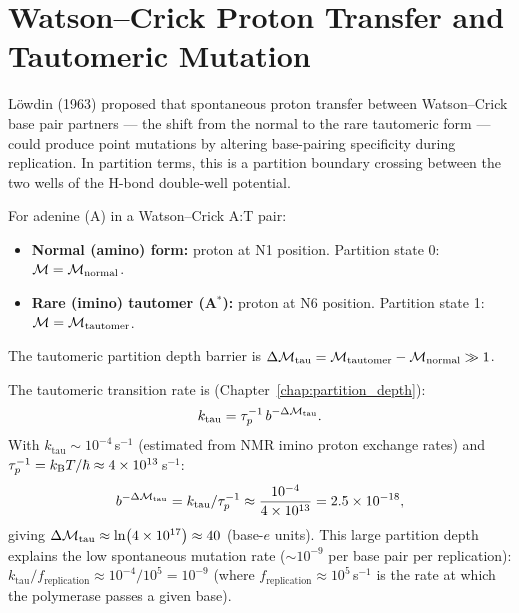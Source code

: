 \section{Watson--Crick Proton Transfer and Tautomeric Mutation}
\label{sec:proton_transfer}

Löwdin (1963) proposed that spontaneous proton transfer between Watson--Crick
base pair partners --- the shift from the normal to the rare tautomeric form ---
could produce point mutations by altering base-pairing specificity during
replication. In partition terms, this is a partition boundary crossing
between the two wells of the H-bond double-well potential.

\begin{definition}
\label{def:tautomeric_states}
For adenine (A) in a Watson--Crick A:T pair:
\begin{itemize}
  \item \textbf{Normal (amino) form:} proton at N1 position.
        Partition state 0: $\mathcal{M} = \mathcal{M}_{\mathrm{normal}}$.
  \item \textbf{Rare (imino) tautomer (A$^*$):} proton at N6 position.
        Partition state 1: $\mathcal{M} = \mathcal{M}_{\mathrm{tautomer}}$.
\end{itemize}
The tautomeric partition depth barrier is
$\Delta\mathcal{M}_{\mathrm{tau}} = \mathcal{M}_{\mathrm{tautomer}} - \mathcal{M}_{\mathrm{normal}} \gg 1$.
\end{definition}

The tautomeric transition rate is (Chapter~\ref{chap:partition_depth}):
\begin{equation}
  k_{\mathrm{tau}} = \tau_p^{-1}\,b^{-\Delta\mathcal{M}_{\mathrm{tau}}}.
  \label{eq:tautomeric_rate}
\end{equation}
With $k_{\mathrm{tau}} \sim 10^{-4}$\,s$^{-1}$ (estimated from NMR imino proton
exchange rates) and $\tau_p^{-1} = k_{\mathrm{B}} T / \hbar \approx 4 \times 10^{13}$\,s$^{-1}$:
\begin{equation}
  b^{-\Delta\mathcal{M}_{\mathrm{tau}}} = k_{\mathrm{tau}} / \tau_p^{-1}
    \approx \frac{10^{-4}}{4 \times 10^{13}} = 2.5 \times 10^{-18},
  \label{eq:tautomeric_depth_ratio}
\end{equation}
giving $\Delta\mathcal{M}_{\mathrm{tau}} \approx \ln(4 \times 10^{17}) \approx 40$
(base-$e$ units). This large partition depth explains the low spontaneous
mutation rate ($\sim 10^{-9}$ per base pair per replication):
$k_{\mathrm{tau}} / f_{\mathrm{replication}} \approx 10^{-4} / 10^5 = 10^{-9}$
(where $f_{\mathrm{replication}} \approx 10^5$\,s$^{-1}$ is the rate at which
the polymerase passes a given base).

